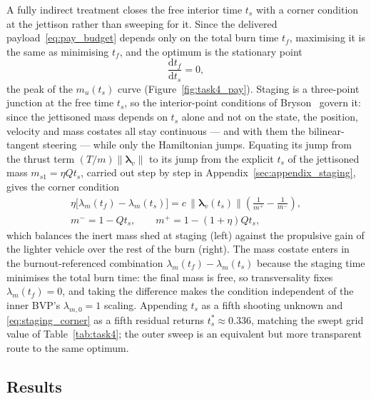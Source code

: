 \documentclass[../main.tex]{subfiles}
\begin{document}
A fully indirect treatment closes the free interior time $t_s$ with a corner condition at the jettison rather than sweeping for it. Since the delivered payload~\eqref{eq:pay_budget} depends only on the total burn time $t_f$, maximising it is the same as minimising $t_f$, and the optimum is the stationary point
\begin{equation}
    \frac{\mathrm{d}t_f}{\mathrm{d}t_s} = 0,
    \label{eq:staging_opt}
\end{equation}
the peak of the $m_u(t_s)$ curve (Figure~\ref{fig:task4_pay}). Staging is a three-point junction at the free time $t_s$, so the interior-point conditions of Bryson~\cite[Sec.~3.5]{bryson1975} govern it: since the jettisoned mass depends on $t_s$ alone and not on the state, the position, velocity and mass costates all stay continuous --- and with them the bilinear-tangent steering --- while only the Hamiltonian jumps. Equating its jump from the thrust term $(T/m)\|\boldsymbol{\lambda}_v\|$ to its jump from the explicit $t_s$ of the jettisoned mass $m_{s1} = \eta Q t_s$, carried out step by step in Appendix~\ref{sec:appendix_staging}, gives the corner condition
\begin{equation}
\begin{gathered}
    \eta\bigl[\lambda_m(t_f) - \lambda_m(t_s)\bigr]
    = c\,\|\boldsymbol{\lambda}_v(t_s)\|\left(\frac{1}{m^+} - \frac{1}{m^-}\right), \\
    m^- = 1 - Q t_s, \qquad m^+ = 1 - (1+\eta)Q t_s,
\end{gathered}
    \label{eq:staging_corner}
\end{equation}
which balances the inert mass shed at staging (left) against the propulsive gain of the lighter vehicle over the rest of the burn (right). The mass costate enters in the burnout-referenced combination $\lambda_m(t_f) - \lambda_m(t_s)$ because the staging time minimises the total burn time: the final mass is free, so transversality fixes $\lambda_m(t_f) = 0$, and taking the difference makes the condition independent of the inner BVP's $\lambda_{m,0} = 1$ scaling. Appending $t_s$ as a fifth shooting unknown and \eqref{eq:staging_corner} as a fifth residual returns $t_s^\ast \approx 0.336$, matching the swept grid value of Table~\ref{tab:task4}; the outer sweep is an equivalent but more transparent route to the same optimum.

\subsection{Results}
\end{document}
